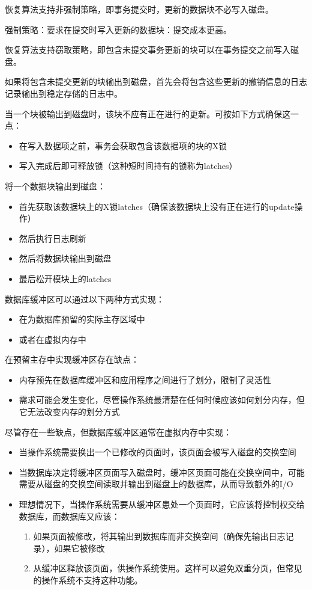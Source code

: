 恢复算法支持非强制策略，即事务提交时，更新的数据块不必写入磁盘。

强制策略：要求在提交时写入更新的数据块：提交成本更高。

恢复算法支持窃取策略，即包含未提交事务更新的块可以在事务提交之前写入磁盘。

如果将包含未提交更新的块输出到磁盘，首先会将包含这些更新的撤销信息的日志记录输出到稳定存储的日志中。

当一个块被输出到磁盘时，该块不应有正在进行的更新。可按如下方式确保这一点：
\begin{itemize}
    \item 在写入数据项之前，事务会获取包含该数据项的块的X锁
    \item 写入完成后即可释放锁（这种短时间持有的锁称为latches）
\end{itemize}

将一个数据块输出到磁盘：
\begin{itemize}
    \item 首先获取该数据块上的X锁latches（确保该数据块上没有正在进行的update操作）
    \item 然后执行日志刷新
    \item 然后将数据块输出到磁盘
    \item 最后松开模块上的latches
\end{itemize}

数据库缓冲区可以通过以下两种方式实现：
\begin{itemize}
    \item 在为数据库预留的实际主存区域中
    \item 或者在虚拟内存中
\end{itemize}

在预留主存中实现缓冲区存在缺点：
\begin{itemize}
    \item 内存预先在数据库缓冲区和应用程序之间进行了划分，限制了灵活性
    \item 需求可能会发生变化，尽管操作系统最清楚在任何时候应该如何划分内存，但它无法改变内存的划分方式
\end{itemize}

尽管存在一些缺点，但数据库缓冲区通常在虚拟内存中实现：
\begin{itemize}
    \item 当操作系统需要换出一个已修改的页面时，该页面会被写入磁盘的交换空间
    \item 当数据库决定将缓冲区页面写入磁盘时，缓冲区页面可能在交换空间中，可能需要从磁盘的交换空间读取并输出到磁盘上的数据库，从而导致额外的I/O
    \item 理想情况下，当操作系统需要从缓冲区患处一个页面时，它应该将控制权交给数据库，而数据库又应该：
       \begin{enumerate}
           \item 如果页面被修改，将其输出到数据库而非交换空间（确保先输出日志记录），如果它被修改
           \item 从缓冲区释放该页面，供操作系统使用。这样可以避免双重分页，但常见的操作系统不支持这种功能。
       \end{enumerate}
\end{itemize}